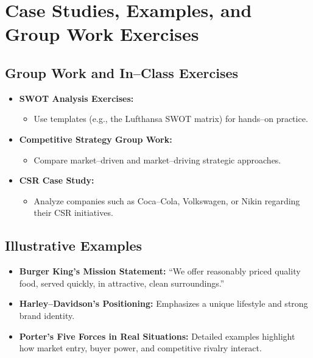 \documentclass[12pt,a4paper]{report}
\begin{document}
\chapter{Case Studies, Examples, and Group Work Exercises}

\section{Group Work and In--Class Exercises}
\begin{itemize}
    \item \textbf{SWOT Analysis Exercises:} 
         \begin{itemize}
             \item Use templates (e.g., the Lufthansa SWOT matrix) for hands--on practice.
         \end{itemize}
    \item \textbf{Competitive Strategy Group Work:}
         \begin{itemize}
             \item Compare market--driven and market--driving strategic approaches.
         \end{itemize}
    \item \textbf{CSR Case Study:}
         \begin{itemize}
             \item Analyze companies such as Coca--Cola, Volkswagen, or Nikin regarding their CSR initiatives.
         \end{itemize}
\end{itemize}

\section{Illustrative Examples}
\begin{itemize}
    \item \textbf{Burger King’s Mission Statement:} “We offer reasonably priced quality food, served quickly, in attractive, clean surroundings.”
    \item \textbf{Harley--Davidson’s Positioning:} Emphasizes a unique lifestyle and strong brand identity.
    \item \textbf{Porter’s Five Forces in Real Situations:} Detailed examples highlight how market entry, buyer power, and competitive rivalry interact.
\end{itemize}
\end{document}
